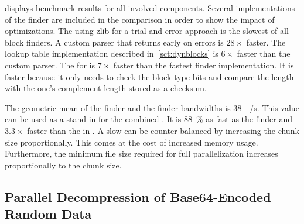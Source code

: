  displays benchmark results for all involved components.
Several implementations of the \dynblock finder are included in the comparison in order to show the impact of optimizations.
The \blockfinder using zlib for a trial-and-error approach is the slowest of all block finders.
A custom  parser that returns early on errors is $28\times$ faster.
The lookup table implementation described in~\cref{sct:dynblocks} is $6\times$ faster than the custom  parser.
The \blockfinder for \rawblocks is $7\times$ faster than the fastest \dynblock finder implementation. It is faster because it only needs to check the block type bits and compare the length with the one's complement length stored as a checksum.

The geometric mean of the \dynblock finder and the \rawblock finder bandwidths is \SI{38}{\mebi\byte/\second}.
This value can be used as a stand-in for the combined \blockfinder.
It is \SI{88}{\percent} as fast as the \dynblock finder and $\num{3.3}\times$ faster than the \blockfinder in \pugz.
A slow \blockfinder can be counter-balanced by increasing the chunk size proportionally.
This comes at the cost of increased memory usage.
Furthermore, the minimum file size required for full parallelization increases proportionally to the chunk size.


\subsection{Parallel Decompression of Base64-Encoded Random Data}

